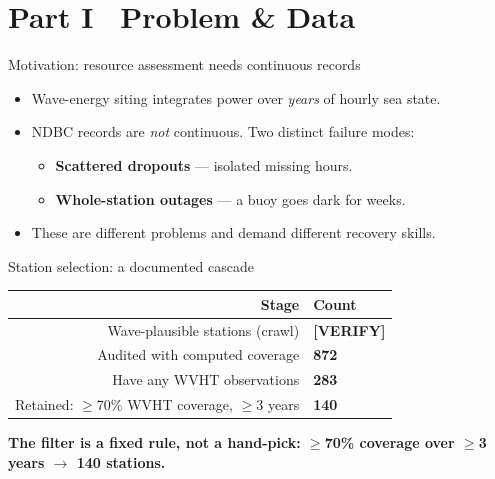 \documentclass[aspectratio=169]{beamer}
\newcommand{\take}[1]{\vspace{0.6ex}\begin{center}\textbf{\color{colgraph}#1}\end{center}}
\begin{document}
\section{Part I \textperiodcentered\ Problem \& Data}

\begin{frame}{Motivation: resource assessment needs continuous records}
  \begin{itemize}
    \item Wave-energy siting integrates power over \emph{years} of hourly sea state.
    \item NDBC records are \emph{not} continuous. Two distinct failure modes:
    \begin{itemize}
      \item[--] \textbf{Scattered dropouts} --- isolated missing hours.
      \item[--] \textbf{Whole-station outages} --- a buoy goes dark for weeks.
    \end{itemize}
    \item These are different problems and demand different recovery skills.
  \end{itemize}
\end{frame}

\begin{frame}{Station selection: a documented cascade}
  \begin{center}
  \begin{tabular}{r l}
    \toprule
    Stage & Count \\
    \midrule
    Wave-plausible stations (crawl) & \textbf{[VERIFY]} \\
    Audited with computed coverage & \textbf{872} \\
    Have any WVHT observations & \textbf{283} \\
    Retained: $\ge$70\% WVHT coverage, $\ge$3 years & \textbf{140} \\
    \bottomrule
  \end{tabular}
  \end{center}
  \take{The filter is a fixed rule, not a hand-pick: $\ge$70\% coverage over $\ge$3 years $\rightarrow$ 140 stations.}
\end{frame}
\end{document}
